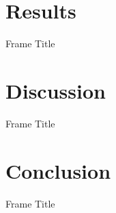 \documentclass{beamer}
\begin{document}
\section{Results}
\begin{frame}{Frame Title}
    
\end{frame}
\section{Discussion}
\begin{frame}{Frame Title}
    
\end{frame}
\section{Conclusion}
    \begin{frame}{Frame Title}
        
    \end{frame}
\end{document}
